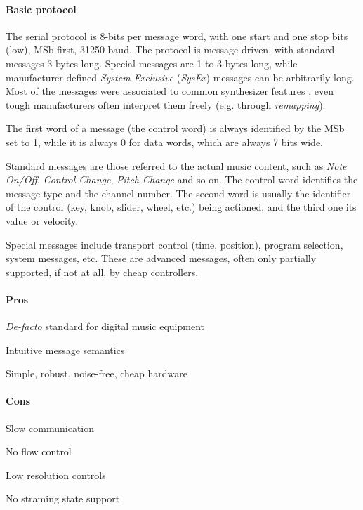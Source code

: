 \documentclass[a4paper,10pt]{article}
\begin{document}
\begin{multicols}{2}
\paragraph{Basic protocol}
The serial protocol is 8-bits per message word, with one start and one stop
bits (low), MSb first, 31250 baud. The protocol is message-driven, with
standard messages 3 bytes long. Special messages are 1 to 3 bytes long, while
manufacturer-defined \emph{System Exclusive} (\emph{SysEx}) messages can be
arbitrarily long. Most of the messages were associated to common synthesizer
features \CITEME, even tough manufacturers often interpret them freely
(e.g. through \emph{remapping}).

The first word of a message (the control word) is always identified by the
MSb set to 1, while it is always 0 for data words, which are always 7 bits wide.

Standard messages are those referred to the actual music content, such as
\emph{Note On/Off}, \emph{Control Change}, \emph{Pitch Change} and so on.
The control word identifies the message type and the channel number. The
second word is usually the identifier of the control (key, knob, slider,
wheel, etc.) being actioned, and the third one its value or velocity.

Special messages include transport control (time, position), program selection,
system messages, etc. These are advanced messages, often only partially
supported, if not at all, by cheap controllers.


\paragraph{Pros}
\begin{itemize*}
	\item \emph{De-facto} standard for digital music equipment
	\item Intuitive message semantics
	\item Simple, robust, noise-free, cheap hardware
\end{itemize*}


\paragraph{Cons}
\begin{itemize*}
	\item Slow communication
	\item No flow control
	\item Low resolution controls
	\item No straming state support
\end{itemize*}



\end{multicols}
\end{document}

